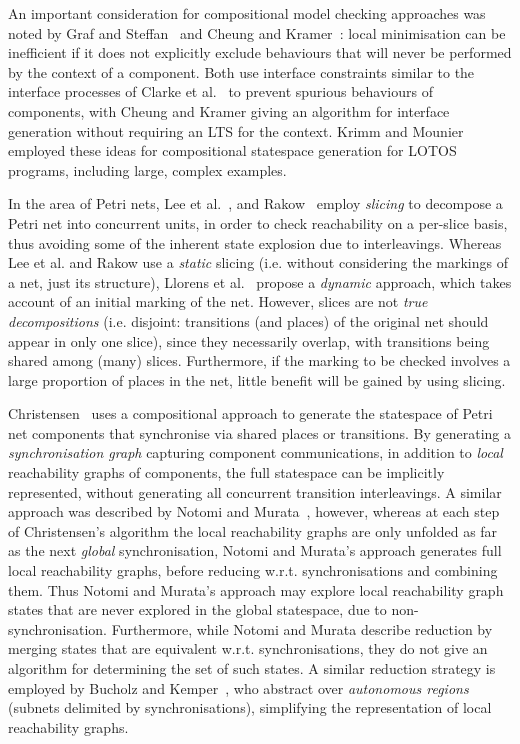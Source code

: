 An important consideration for compositional model checking approaches was
noted by {Graf and Steffan}~\cite{Graf1990} and {Cheung and
Kramer}~\cite{Cheung1993}: local minimisation can be inefficient if it does not
explicitly exclude behaviours that will never be performed by the context
of a component. Both use interface constraints similar to the interface
processes of {Clarke et al.}~\cite{Clarke1989} to prevent spurious behaviours
of components, with {Cheung and Kramer} giving an algorithm for interface
generation without requiring an LTS for the context.  {Krimm and
Mounier}~\cite{Krimm1997} employed these ideas for compositional statespace
generation for LOTOS programs, including large, complex examples.

In the area of Petri nets, {Lee et al.}~\cite{Lee2000}, and
Rakow~\cite{Rakow2008} employ \emph{slicing} to decompose a Petri net into
concurrent units, in order to check reachability on a per-slice basis, thus
avoiding some of the inherent state explosion due to interleavings. Whereas
{Lee et al.} and Rakow use a \emph{static} slicing (i.e. without considering
the markings of a net, just its structure), {Llorens et al.}~\cite{Llorens2008}
propose a \emph{dynamic} approach, which takes account of an initial marking of
the net. However, slices are not \emph{true decompositions} (i.e. disjoint:
transitions (and places) of the original net should appear in only one slice),
since they necessarily overlap, with transitions being shared among (many)
slices. Furthermore, if the marking to be checked involves a large proportion
of places in the net, little benefit will be gained by using slicing.


Christensen~\cite{Christensen2000} uses a compositional approach to generate
the statespace of Petri net components that synchronise via shared places or
transitions. By generating a \emph{synchronisation graph} capturing component
communications, in addition to \emph{local} reachability graphs of components,
the full statespace can be implicitly represented, without generating all
concurrent transition interleavings. A similar approach was described by
{Notomi and Murata}~\cite{Notomi1994}, however, whereas at each step of
Christensen's algorithm the local reachability graphs are only unfolded as far
as the next \emph{global} synchronisation, {Notomi and Murata}'s approach
generates full local reachability graphs, before reducing w.r.t.
synchronisations and combining them. Thus {Notomi and Murata}'s approach may
explore local reachability graph states that are never explored in the global
statespace, due to non-synchronisation.  Furthermore, while Notomi and Murata
describe reduction by merging states that are equivalent w.r.t.
synchronisations, they do not give an algorithm for determining the set of such
states. A similar reduction strategy is employed by {Bucholz and
Kemper}~\cite{Buchholz2002}, who abstract over \emph{autonomous regions} (subnets
delimited by synchronisations), simplifying the representation of
local reachability graphs.
